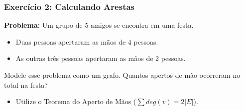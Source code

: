 \documentclass[9pt]{beamer}
\begin{document}
\begin{frame}
    \frametitle{Exercício 2: Calculando Arestas}
    \textbf{Problema:} Um grupo de 5 amigos se encontra em uma festa. 
    \begin{itemize}
        \item Duas pessoas apertaram as mãos de 4 pessoas.
        \item As outras três pessoas apertaram as mãos de 2 pessoas.
    \end{itemize}
    \vspace{0.5cm}
    Modele esse problema como um grafo. Quantos apertos de mão ocorreram no total na festa?
    \begin{itemize}
        \item Utilize o Teorema do Aperto de Mãos ($\sum deg(v) = 2|E|$).
    \end{itemize}
\end{frame}
\end{document}
